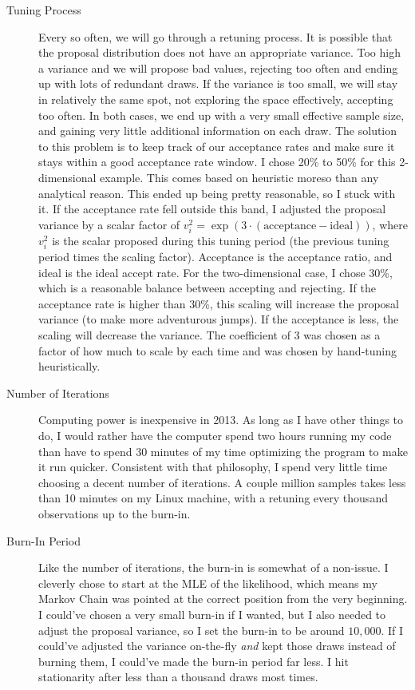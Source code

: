 \documentclass[12pt]{article}
\begin{document}
\begin{description}
\item[Tuning Process] Every so often, we will go through a retuning process. It is possible that the proposal distribution does not have an appropriate variance. Too high a variance and we will propose bad values, rejecting too often and ending up with lots of redundant draws. If the variance is too small, we will stay in relatively the same spot, not exploring the space effectively, accepting too often. In both cases, we end up with a very small effective sample size, and gaining very little additional information on each draw. The solution to this problem is to keep track of our acceptance rates and make sure it stays within a good acceptance rate window. I chose 20\% to 50\% for this 2-dimensional example. This comes based on heuristic moreso than any analytical reason. This ended up being pretty reasonable, so I stuck with it. If the acceptance rate fell outside this band, I adjusted the proposal variance by a scalar factor of $v_i^{2} = \exp{(3 \cdot (\text{acceptance}-\text{ideal}))}$, where $v_i^2$ is the scalar proposed during this tuning period (the previous tuning period times the scaling factor). Acceptance is the acceptance ratio, and ideal is the ideal accept rate. For the two-dimensional case, I chose 30\%, which is a reasonable balance between accepting and rejecting. If the acceptance rate is higher than 30\%, this scaling will increase the proposal variance (to make more adventurous jumps). If the acceptance is less, the scaling will decrease the variance. The coefficient of 3 was chosen as a factor of how much to scale by each time and was chosen by hand-tuning heuristically. 

\item[Number of Iterations] Computing power is inexpensive in 2013. As long as I have other things to do, I would rather have the computer spend two hours running my code than have to spend 30 minutes of my time optimizing the program to make it run quicker. Consistent with that philosophy, I spend very little time choosing a decent number of iterations. A couple million samples takes less than 10 minutes on my Linux machine, with a retuning every thousand observations up to the burn-in.

\item[Burn-In Period] Like the number of iterations, the burn-in is somewhat of a non-issue. I cleverly chose to start at the MLE of the likelihood, which means my Markov Chain was pointed at the correct position from the very beginning. I could've chosen a very small burn-in if I wanted, but I also needed to adjust the proposal variance, so I set the burn-in to be around $10,000$. If I could've adjusted the variance on-the-fly \emph{and} kept those draws instead of burning them, I could've made the burn-in period far less. I hit stationarity after less than a thousand draws most times.
\end{description}
\end{document}
